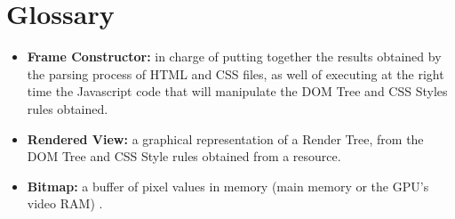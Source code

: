 \documentclass[prodmode,acmtecs]{acmsmall}
\begin{document}
\section{Glossary}
\begin{itemize}\leftskip0.2em
  \item \textbf{Frame Constructor:} in charge of putting together the results obtained by the parsing process of HTML and CSS files, as well of executing at the right time the Javascript code that will manipulate the DOM Tree and CSS Styles rules obtained. 
  \item \textbf{Rendered View:} a graphical representation of a Render Tree, from the DOM Tree and CSS Style rules obtained from a resource.
  \item \textbf{Bitmap:} a buffer of pixel values in memory (main memory or the GPU’s video RAM) \cite{gpuchrome}.
\end{itemize}


  

\end{document}
